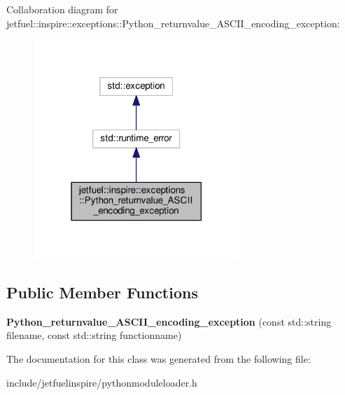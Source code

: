 Collaboration diagram for jetfuel\+:\+:inspire\+:\+:exceptions\+:\+:Python\+\_\+returnvalue\+\_\+\+A\+S\+C\+I\+I\+\_\+encoding\+\_\+exception\+:
\nopagebreak
\begin{figure}[H]
\begin{center}
\leavevmode
\includegraphics[width=219pt]{classjetfuel_1_1inspire_1_1exceptions_1_1Python__returnvalue__ASCII__encoding__exception__coll__graph}
\end{center}
\end{figure}
\subsection*{Public Member Functions}
\begin{DoxyCompactItemize}
\item 
\mbox{\label{classjetfuel_1_1inspire_1_1exceptions_1_1Python__returnvalue__ASCII__encoding__exception_a654d896ec64d3fbb9720e295d52a7f76}} 
{\bfseries Python\+\_\+returnvalue\+\_\+\+A\+S\+C\+I\+I\+\_\+encoding\+\_\+exception} (const std\+::string filename, const std\+::string functionname)
\end{DoxyCompactItemize}


The documentation for this class was generated from the following file\+:\begin{DoxyCompactItemize}
\item 
include/jetfuelinspire/pythonmoduleloader.\+h\end{DoxyCompactItemize}
